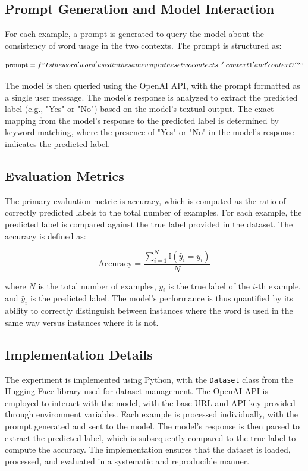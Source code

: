 \documentclass{article}
\begin{document}
\subsection{Prompt Generation and Model Interaction}

For each example, a prompt is generated to query the model about the consistency of word usage in the two contexts. The prompt is structured as:

$$
\text{prompt} = f"Is the word '{word}' used in the same way in these two contexts: '{context1}' and '{context2}'?"
$$

The model is then queried using the OpenAI API, with the prompt formatted as a single user message. The model's response is analyzed to extract the predicted label (e.g., "Yes" or "No") based on the model's textual output. The exact mapping from the model's response to the predicted label is determined by keyword matching, where the presence of "Yes" or "No" in the model's response indicates the predicted label.

\subsection{Evaluation Metrics}

The primary evaluation metric is accuracy, which is computed as the ratio of correctly predicted labels to the total number of examples. For each example, the predicted label is compared against the true label provided in the dataset. The accuracy is defined as:

$$
\text{Accuracy} = \frac{\sum_{i=1}^{N} \mathbb{I}(\hat{y}_i = y_i)}{N}
$$

where $ N $ is the total number of examples, $ y_i $ is the true label of the $ i $-th example, and $ \hat{y}_i $ is the predicted label. The model's performance is thus quantified by its ability to correctly distinguish between instances where the word is used in the same way versus instances where it is not.

\subsection{Implementation Details}

The experiment is implemented using Python, with the \texttt{Dataset} class from the Hugging Face library used for dataset management. The OpenAI API is employed to interact with the model, with the base URL and API key provided through environment variables. Each example is processed individually, with the prompt generated and sent to the model. The model's response is then parsed to extract the predicted label, which is subsequently compared to the true label to compute the accuracy. The implementation ensures that the dataset is loaded, processed, and evaluated in a systematic and reproducible manner.
\end{document}
